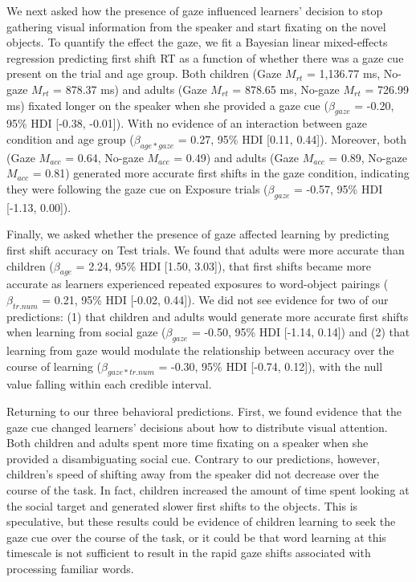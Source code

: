\documentclass[man,floatsintext]{apa6}
\begin{document}
We next asked how the presence of gaze influenced learners' decision to
stop gathering visual information from the speaker and start fixating on
the novel objects. To quantify the effect the gaze, we fit a Bayesian
linear mixed-effects regression predicting first shift RT as a function
of whether there was a gaze cue present on the trial and age group. Both
children (Gaze \(M_{rt}\) = 1,136.77 ms, No-gaze \(M_{rt}\) = 878.37 ms)
and adults (Gaze \(M_{rt}\) = 878.65 ms, No-gaze \(M_{rt}\) = 726.99 ms)
fixated longer on the speaker when she provided a gaze cue
(\(\beta_{gaze}\) = -0.20, 95\% HDI {[}-0.38, -0.01{]}). With no
evidence of an interaction between gaze condition and age group
(\(\beta_{age*gaze}\) = 0.27, 95\% HDI {[}0.11, 0.44{]}). Moreover, both
(Gaze \(M_{acc}\) = 0.64, No-gaze \(M_{acc}\) = 0.49) and adults (Gaze
\(M_{acc}\) = 0.89, No-gaze \(M_{acc}\) = 0.81) generated more accurate
first shifts in the gaze condition, indicating they were following the
gaze cue on Exposure trials (\(\beta_{gaze}\) = -0.57, 95\% HDI
{[}-1.13, 0.00{]}).

Finally, we asked whether the presence of gaze affected learning by
predicting first shift accuracy on Test trials. We found that adults
were more accurate than children (\(\beta_{age}\) = 2.24, 95\% HDI
{[}1.50, 3.03{]}), that first shifts became more accurate as learners
experienced repeated exposures to word-object pairings
(\(\beta_{tr.num}\) = 0.21, 95\% HDI {[}-0.02, 0.44{]}). We did not see
evidence for two of our predictions: (1) that children and adults would
generate more accurate first shifts when learning from social gaze
(\(\beta_{gaze}\) = -0.50, 95\% HDI {[}-1.14, 0.14{]}) and (2) that
learning from gaze would modulate the relationship between accuracy over
the course of learning (\(\beta_{gaze*tr.num}\) = -0.30, 95\% HDI
{[}-0.74, 0.12{]}), with the null value falling within each credible
interval.

Returning to our three behavioral predictions. First, we found evidence
that the gaze cue changed learners' decisions about how to distribute
visual attention. Both children and adults spent more time fixating on a
speaker when she provided a disambiguating social cue. Contrary to our
predictions, however, children's speed of shifting away from the speaker
did not decrease over the course of the task. In fact, children
increased the amount of time spent looking at the social target and
generated slower first shifts to the objects. This is speculative, but
these results could be evidence of children learning to seek the gaze
cue over the course of the task, or it could be that word learning at
this timescale is not sufficient to result in the rapid gaze shifts
associated with processing familiar words.
\end{document}
